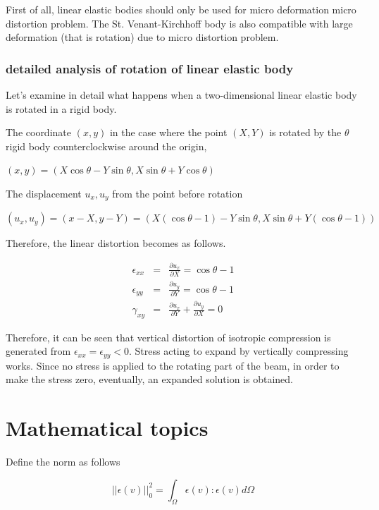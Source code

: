 First of all, linear elastic bodies should only be used for micro deformation micro distortion problem. The St. Venant-Kirchhoff body is also compatible with large deformation (that is rotation) due to micro distortion problem.

\subsubsection{detailed analysis of rotation of linear elastic body}


Let's examine in detail what happens when a two-dimensional linear elastic body is rotated in a rigid body.

The coordinate $(x,y)$ in the case where the point $(X,Y)$ is rotated by the $\theta$ rigid body counterclockwise around the origin,

$(x,y)=(X\cos\theta-Y\sin\theta,X\sin\theta+Y\cos\theta)$

The displacement $u_x,u_y$ from the point before rotation

$(u_x,u_y)=(x-X,y-Y)=(X(\cos\theta-1)-Y\sin\theta,X\sin\theta+Y(\cos\theta-1))$

Therefore, the linear distortion becomes as follows.

\begin{eqnarray}
\epsilon_{xx} &=& \frac{\partial u_x}{\partial X}=\cos\theta-1\\
\epsilon_{yy} &=& \frac{\partial u_y}{\partial Y}=\cos\theta-1\\
\gamma_{xy}  &=& \frac{\partial u_x}{\partial Y}+\frac{\partial u_y}{\partial X}=0
\end{eqnarray}


Therefore, it can be seen that vertical distortion of isotropic compression is generated from $\epsilon_{xx}=\epsilon_{yy}<0$. Stress acting to expand by vertically compressing works. Since no stress is applied to the rotating part of the beam, in order to make the stress zero, eventually, an expanded solution is obtained.


\section{Mathematical topics}


Define the norm as follows

\begin{equation}
||\epsilon(v)||^2_0=\int_{\Omega}\epsilon(v):\epsilon(v)d\Omega
\end{equation}

